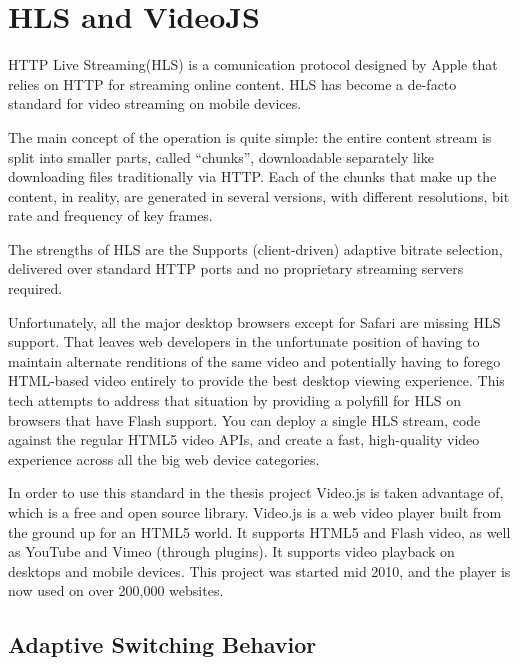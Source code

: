 \section{HLS and VideoJS}
\label{sec:HLS and VideoJS}

HTTP Live Streaming(HLS) is a comunication protocol designed by Apple that relies on HTTP for streaming online content.
HLS has become a de-facto standard for video streaming on mobile devices. 

The main concept of the operation is quite simple: the entire content stream is split into smaller parts, called “chunks”, downloadable separately like downloading files traditionally via HTTP.
Each of the chunks that make up the content, in reality, are generated in several versions, with different resolutions, bit rate and frequency of key frames.

The strengths of HLS are the Supports (client-driven) adaptive bitrate selection, delivered over standard HTTP ports and no proprietary streaming servers required.

Unfortunately, all the major desktop browsers except for Safari are missing HLS support. That leaves web developers in the unfortunate position of having to maintain alternate renditions of the same video and potentially having to forego HTML-based video entirely to provide the best desktop viewing experience.
This tech attempts to address that situation by providing a polyfill for HLS on browsers that have Flash support. You can deploy a single HLS stream, code against the regular HTML5 video APIs, and create a fast, high-quality video experience across all the big web device categories.\cite{videojs_hls}


In order to use this standard in the thesis project Video.js is taken advantage of, which is a free and open source library.
Video.js is a web video player built from the ground up for an HTML5 world. It supports HTML5 and Flash video, as well as YouTube and Vimeo (through plugins). It supports video playback on desktops and mobile devices. This project was started mid 2010, and the player is now used on over 200,000 websites.\cite{videojs}


\subsection{Adaptive Switching Behavior}
\label{sec:Adaptive Switching Behavior}

